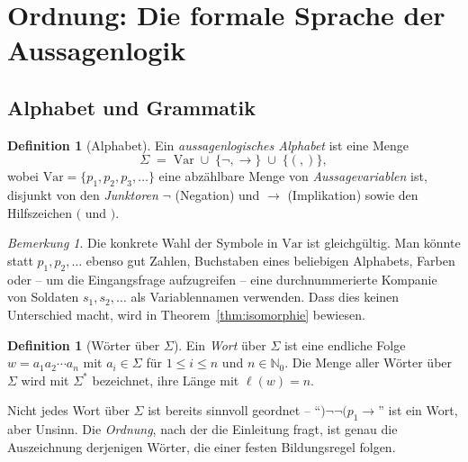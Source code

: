 \documentclass[12pt, a4paper]{article}
\theoremstyle{definition}
\newtheorem{definition}[theorem]{Definition}
\theoremstyle{remark}
\newtheorem{remark}[theorem]{Bemerkung}
\newcommand{\N}{\mathbb{N}}
\newcommand{\Var}{\mathrm{Var}}
\newcommand{\len}{\ell}
\begin{document}
\section{Ordnung: Die formale Sprache der Aussagenlogik}
\label{sec:syntax}

\subsection{Alphabet und Grammatik}
\label{subsec:alphabet}

\begin{definition}[Alphabet]
\label{def:alphabet}
Ein \emph{aussagenlogisches Alphabet} ist eine Menge
\[
  \Sigma \;=\; \Var \;\cup\; \{\neg, \to\} \;\cup\; \{(, )\},
\]
wobei $\Var = \{p_1, p_2, p_3, \dots\}$ eine abzählbare Menge von \emph{Aussagevariablen} ist, disjunkt von den \emph{Junktoren} $\neg$ (Negation) und $\to$ (Implikation) sowie den Hilfszeichen $($ und $)$.
\end{definition}

\begin{remark}
\label{rem:soldaten}
Die konkrete Wahl der Symbole in $\Var$ ist gleichgültig. Man könnte statt $p_1, p_2, \dots$ ebenso gut Zahlen, Buchstaben eines beliebigen Alphabets, Farben oder -- um die Eingangsfrage aufzugreifen -- eine durchnummerierte Kompanie von Soldaten $s_1, s_2, \dots$ als Variablennamen verwenden. Dass dies keinen Unterschied macht, wird in Theorem~\ref{thm:isomorphie} bewiesen.
\end{remark}

\begin{definition}[Wörter über $\Sigma$]
\label{def:woerter}
Ein \emph{Wort} über $\Sigma$ ist eine endliche Folge $w = a_1 a_2 \cdots a_n$ mit $a_i \in \Sigma$ für $1 \le i \le n$ und $n \in \N_0$. Die Menge aller Wörter über $\Sigma$ wird mit $\Sigma^\ast$ bezeichnet, ihre Länge mit $\len(w) = n$.
\end{definition}

Nicht jedes Wort über $\Sigma$ ist bereits sinnvoll geordnet -- ``$)\neg\neg(p_1\to{}$'' ist ein Wort, aber Unsinn. Die \emph{Ordnung}, nach der die Einleitung fragt, ist genau die Auszeichnung derjenigen Wörter, die einer festen Bildungsregel folgen.
\end{document}
